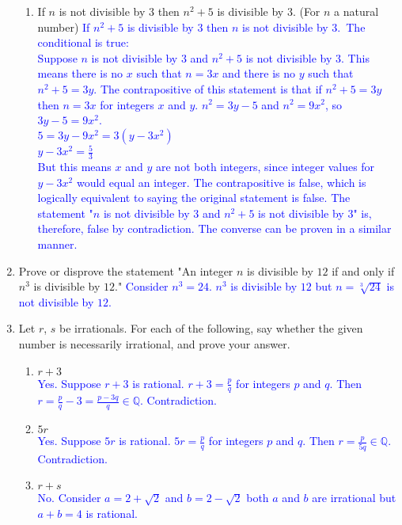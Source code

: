 \documentclass[13.5pt]{article}
\begin{document}
\begin{enumerate}
\begin{enumerate}
\item{If \(n\) is not divisible by \(3\) then \(n^2+5\) is divisible by \(3\). (For \(n\) a natural number)}
\textcolor{blue} {If \(n^2+5\) is divisible by \(3\) then \(n\) is not divisible by \(3\).}\
\textcolor{blue} {The conditional is true:}\\
\textcolor{blue} {Suppose \(n\) is not divisible by \(3\) and \(n^2+5\) is not divisible by \(3\). This means there is no \(x\) such that \(n=3x\) and there is no \(y\) such that \(n^2+5=3y\). The contrapositive of this statement is that if \(n^2+5=3y\) then \(n=3x\) for integers \(x\) and \(y\).} 
\textcolor{blue} {\(n^2=3y-5\) and \(n^2=9x^2\), so \(3y-5=9x^2\).}\\ 
\textcolor{blue} {\(5=3y-9x^2=3(y-3x^2)\)}\\ 
\textcolor{blue} {\(y-3x^2=\frac{5}{3}\)}\\
\textcolor{blue} {But this means \(x\) and \(y\) are not both integers, since integer values for \(y-3x^2\) would equal an integer. The contrapositive is false, which is logically equivalent to saying the original statement is false. The statement "\(n\) is not divisible by \(3\) and \(n^2+5\) is not divisible by \(3\)" is, therefore, false by contradiction.}
\textcolor{blue} {The converse can be proven in a similar manner.}
\end{enumerate}
\item{Prove or disprove the statement "An integer \(n\) is divisible by \(12\) if and only if \(n^3\) is divisible by \(12\)."}
\textcolor{blue} {Consider \(n^3=24\). \(n^3\) is divisible by \(12\) but \(n=\sqrt[3]{24}\) is not divisible by \(12\).}

\item{Let \(r\), \(s\) be irrationals. For each of the following, say whether the given number is necessarily irrational, and prove your answer.}
\begin{enumerate}
\setlength{\itemindent}{.1in}
\item {\(r+3\)}\\
\textcolor{blue} {Yes. Suppose \(r+3\) is rational. \(r+3=\frac{p}{q}\) for integers \(p\) and \(q\). Then \(r=\frac{p}{q}-3=\frac{p-3q}{q} \in\mathbb{Q}\). Contradiction.} 
\item {\(5r\)}\\
\textcolor{blue} {Yes. Suppose \(5r\) is rational. \(5r=\frac{p}{q}\) for integers \(p\) and \(q\). Then \(r=\frac{p}{5q} \in\mathbb{Q}\). Contradiction.} 

\item {\(r+s\)}\\
\textcolor{blue} {No. Consider \(a=2+\sqrt{2}\) and \(b=2-\sqrt{2}\) both \(a\) and \(b\) are irrational but \(a+b=4\) is rational.} 


\end{enumerate}
\end{enumerate}
\end{document}
